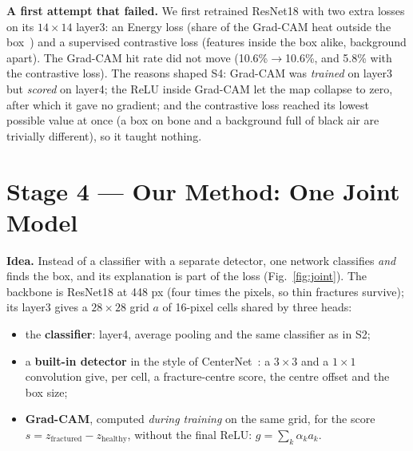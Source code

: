 \documentclass[conference]{IEEEtran}
\begin{document}
\textbf{A first attempt that failed.} We first retrained ResNet18 with two extra losses on its $14\times14$ layer3: an
Energy loss (share of the Grad-CAM heat outside the box~\cite{rao2023guide}) and a supervised contrastive loss (features
inside the box alike, background apart). The Grad-CAM hit rate did not move (10.6\%$\to$10.6\%, and 5.8\% with the
contrastive loss). The reasons shaped S4: Grad-CAM was \emph{trained} on layer3 but \emph{scored} on layer4; the ReLU
inside Grad-CAM let the map collapse to zero, after which it gave no gradient; and the contrastive loss reached its
lowest possible value at once (a box on bone and a background full of black air are trivially different), so it taught
nothing.

\section{Stage 4 --- Our Method: One Joint Model}
\label{sec:joint}
\textbf{Idea.} Instead of a classifier with a separate detector, one network classifies \emph{and} finds the box, and
its explanation is part of the loss (Fig.~\ref{fig:joint}). The backbone is ResNet18 at 448 px (four times the pixels,
so thin fractures survive); its layer3 gives a $28\times28$ grid $a$ of 16-pixel cells shared by three heads:
\begin{itemize}
\item the \textbf{classifier}: layer4, average pooling and the same classifier as in S2;
\item a \textbf{built-in detector} in the style of CenterNet~\cite{zhou2019centernet}: a $3\times3$ and a $1\times1$
convolution give, per cell, a fracture-centre score, the centre offset and the box size;
\item \textbf{Grad-CAM}, computed \emph{during training} on the same grid, for the score
$s=z_{\text{fractured}}-z_{\text{healthy}}$, without the final ReLU: $g=\sum_k \alpha_k a_k$.
\end{itemize}
\end{document}
